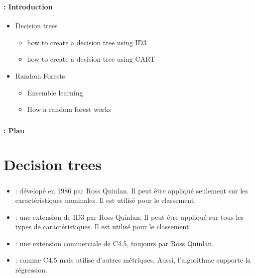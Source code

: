 \documentclass[xcolor=table]{beamer}
\subtitle[DT \& Ensemble]{Decision trees and Ensemble learning}
\begin{document}
	
\begin{frame}
	\frametitle{\inserttitle}
	\framesubtitle{\insertshortsubtitle: Introduction}
	
	\begin{itemize}
		\item Decision trees
		\begin{itemize}
			\item how to create a decision tree using ID3
			\item how to create a decision tree using CART
		\end{itemize}
		\item Random Forests
		\begin{itemize}
			\item Ensemble learning
			\item How a random forest works
		\end{itemize}
	\end{itemize}

\end{frame}


\begin{frame}
	\frametitle{\inserttitle}
	\framesubtitle{\insertshortsubtitle: Plan}
	
	\begin{multicols}{2}
		\tableofcontents
	\end{multicols}
\end{frame}

\section{Decision trees}

\begin{frame}
	\frametitle{\insertsection}
	
	\begin{itemize}
		\item {} : dévelopé en 1986 par Ross Quinlan. Il peut être appliqué seulement sur les caractéristiques nominales. Il est utilisé pour le classement.
		\item {} : une extension de ID3 par Ross Quinlan. Il peut être appliqué sur tous les types de caractéristiques. Il est utilisé pour le classement.
		\item {} : une extension commerciale de C4.5, toujours par Ross Quinlan.
		\item {} : comme C4.5 mais utilise d'autres métriques. Aussi, l'algorithme supporte la régression.
	\end{itemize}
	
\end{frame}
\end{document}
